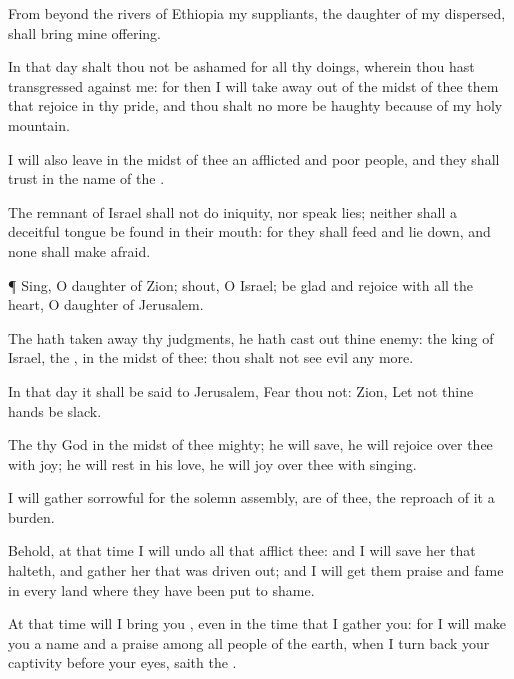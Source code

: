 {From
beyond the
rivers of
Ethiopia my
suppliants,
{} the
daughter of my
dispersed, shall
bring mine
offering.

In that
day shalt thou not be
ashamed for all thy
doings, wherein thou hast
transgressed against me: for then I will take
away out of the
midst of thee them that
rejoice in thy
pride, and thou shalt no
more be
haughty because of my
holy
mountain.

I will also
leave in the
midst of thee an
afflicted and
poor
people, and they shall
trust in the
name of the
{}.

The
remnant of
Israel shall not
do
iniquity, nor
speak
lies; neither shall a
deceitful
tongue be
found in their
mouth: for they shall
feed and lie
down, and none shall make
{}
afraid.


\par }{\PP {}¶
Sing, O
daughter of
Zion;
shout, O
Israel; be
glad and
rejoice with all the
heart, O
daughter of
Jerusalem.

The
{} hath taken
away thy
judgments, he hath cast
out thine
enemy: the
king of
Israel,
{} the
{},
{} in the
midst of thee: thou shalt not
see
evil any more.

In that
day it shall be
said to
Jerusalem,
Fear thou not:
{}
Zion, Let not thine
hands be
slack.

The
{} thy
God in the
midst of thee
{}
mighty; he will
save, he will
rejoice over thee with
joy; he will
rest in his
love, he will
joy over thee with
singing.

I will
gather
{}
sorrowful for the solemn
assembly,
{} are of thee,
{} the
reproach of it
{} a
burden.

Behold, at that
time I will
undo all that
afflict thee: and I will
save her that
halteth, and
gather her that was driven
out; and I will
get them
praise and
fame in every
land where they have been put to
shame.

At that
time will I
bring you
{}, even in the
time that I
gather you: for I will
make you a
name and a
praise among all
people of the
earth, when I turn
back your
captivity before your
eyes,
saith the
{}.


\par }